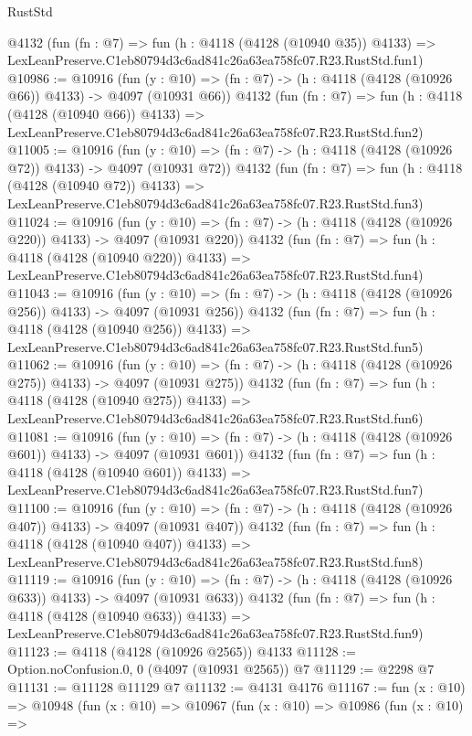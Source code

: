 \begin{lexlean}{RustStd}
\begin{coremodule}
    @4132
    (fun (fn : @7) =>
    fun (h : @4118 (@4128 (@10940 @35)) @4133) =>
    LexLeanPreserve.C1eb80794d3c6ad841c26a63ea758fc07.R23.RustStd.fun1)
@10986 := @10916
    (fun (y : @10) => (fn : @7) -> (h : @4118 (@4128 (@10926 @66)) @4133) -> @4097 (@10931 @66))
    @4132
    (fun (fn : @7) =>
    fun (h : @4118 (@4128 (@10940 @66)) @4133) =>
    LexLeanPreserve.C1eb80794d3c6ad841c26a63ea758fc07.R23.RustStd.fun2)
@11005 := @10916
    (fun (y : @10) => (fn : @7) -> (h : @4118 (@4128 (@10926 @72)) @4133) -> @4097 (@10931 @72))
    @4132
    (fun (fn : @7) =>
    fun (h : @4118 (@4128 (@10940 @72)) @4133) =>
    LexLeanPreserve.C1eb80794d3c6ad841c26a63ea758fc07.R23.RustStd.fun3)
@11024 := @10916
    (fun (y : @10) => (fn : @7) -> (h : @4118 (@4128 (@10926 @220)) @4133) -> @4097 (@10931 @220))
    @4132
    (fun (fn : @7) =>
    fun (h : @4118 (@4128 (@10940 @220)) @4133) =>
    LexLeanPreserve.C1eb80794d3c6ad841c26a63ea758fc07.R23.RustStd.fun4)
@11043 := @10916
    (fun (y : @10) => (fn : @7) -> (h : @4118 (@4128 (@10926 @256)) @4133) -> @4097 (@10931 @256))
    @4132
    (fun (fn : @7) =>
    fun (h : @4118 (@4128 (@10940 @256)) @4133) =>
    LexLeanPreserve.C1eb80794d3c6ad841c26a63ea758fc07.R23.RustStd.fun5)
@11062 := @10916
    (fun (y : @10) => (fn : @7) -> (h : @4118 (@4128 (@10926 @275)) @4133) -> @4097 (@10931 @275))
    @4132
    (fun (fn : @7) =>
    fun (h : @4118 (@4128 (@10940 @275)) @4133) =>
    LexLeanPreserve.C1eb80794d3c6ad841c26a63ea758fc07.R23.RustStd.fun6)
@11081 := @10916
    (fun (y : @10) => (fn : @7) -> (h : @4118 (@4128 (@10926 @601)) @4133) -> @4097 (@10931 @601))
    @4132
    (fun (fn : @7) =>
    fun (h : @4118 (@4128 (@10940 @601)) @4133) =>
    LexLeanPreserve.C1eb80794d3c6ad841c26a63ea758fc07.R23.RustStd.fun7)
@11100 := @10916
    (fun (y : @10) => (fn : @7) -> (h : @4118 (@4128 (@10926 @407)) @4133) -> @4097 (@10931 @407))
    @4132
    (fun (fn : @7) =>
    fun (h : @4118 (@4128 (@10940 @407)) @4133) =>
    LexLeanPreserve.C1eb80794d3c6ad841c26a63ea758fc07.R23.RustStd.fun8)
@11119 := @10916
    (fun (y : @10) => (fn : @7) -> (h : @4118 (@4128 (@10926 @633)) @4133) -> @4097 (@10931 @633))
    @4132
    (fun (fn : @7) =>
    fun (h : @4118 (@4128 (@10940 @633)) @4133) =>
    LexLeanPreserve.C1eb80794d3c6ad841c26a63ea758fc07.R23.RustStd.fun9)
@11123 := @4118 (@4128 (@10926 @2565)) @4133
@11128 := Option.noConfusion.{0, 0} (@4097 (@10931 @2565)) @7
@11129 := @2298 @7
@11131 := @11128 @11129 @7
@11132 := @4131 @4176
@11167 := fun (x : @10) =>
  @10948
    (fun (x : @10) =>
    @10967
      (fun (x : @10) =>
      @10986
        (fun (x : @10) =>

\end{coremodule}
\end{lexlean}
